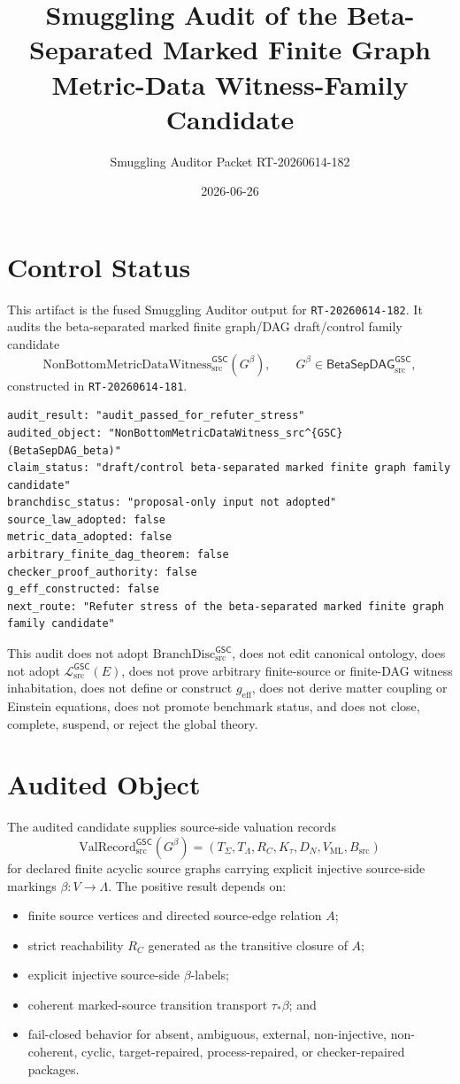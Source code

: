 \documentclass[11pt]{article}
\title{Smuggling Audit of the Beta-Separated Marked Finite Graph Metric-Data Witness-Family Candidate}
\author{Smuggling Auditor Packet RT-20260614-182}
\date{2026-06-26}
\newcommand{\Witness}{\mathrm{NonBottomMetricDataWitness}_{\mathrm{src}}^{\mathsf{GSC}}}
\newcommand{\MetricData}{\mathcal{L}_{\mathrm{src}}^{\mathsf{GSC}}}
\newcommand{\ValRecord}{\mathrm{ValRecord}_{\mathrm{src}}^{\mathsf{GSC}}}
\newcommand{\geff}{g_{\mathrm{eff}}}
\newcommand{\BranchDisc}{\mathrm{BranchDisc}_{\mathrm{src}}^{\mathsf{GSC}}}
\newcommand{\BetaGraph}{\mathsf{BetaSepDAG}_{\mathrm{src}}^{\mathsf{GSC}}}
\begin{document}
\maketitle

\section{Control Status}

This artifact is the fused Smuggling Auditor output for
\texttt{RT-20260614-182}. It audits the beta-separated marked finite graph/DAG
draft/control family candidate
\[
  \Witness(G^\beta),\qquad G^\beta\in \BetaGraph,
\]
constructed in \texttt{RT-20260614-181}.

\begin{verbatim}
audit_result: "audit_passed_for_refuter_stress"
audited_object: "NonBottomMetricDataWitness_src^{GSC}(BetaSepDAG_beta)"
claim_status: "draft/control beta-separated marked finite graph family candidate"
branchdisc_status: "proposal-only input not adopted"
source_law_adopted: false
metric_data_adopted: false
arbitrary_finite_dag_theorem: false
checker_proof_authority: false
g_eff_constructed: false
next_route: "Refuter stress of the beta-separated marked finite graph family candidate"
\end{verbatim}

This audit does not adopt \(\BranchDisc\), does not edit canonical ontology,
does not adopt \(\MetricData(E)\), does not prove arbitrary finite-source or
finite-DAG witness inhabitation, does not define or construct \(\geff\), does
not derive matter coupling or Einstein equations, does not promote benchmark
status, and does not close, complete, suspend, or reject the global theory.

\section{Audited Object}

The audited candidate supplies source-side valuation records
\[
  \ValRecord(G^\beta)=
  (T_{\Sigma},T_{\Lambda},R_C,K_{\tau},D_N,V_{\mathrm{ML}},B_{\mathrm{src}})
\]
for declared finite acyclic source graphs carrying explicit injective
source-side markings \(\beta:V\to\Lambda\). The positive result depends on:
\begin{itemize}[leftmargin=*]
  \item finite source vertices and directed source-edge relation \(A\);
  \item strict reachability \(R_C\) generated as the transitive closure of \(A\);
  \item explicit injective source-side \(\beta\)-labels;
  \item coherent marked-source transition transport \(\tau_\ast\beta\); and
  \item fail-closed behavior for absent, ambiguous, external, non-injective,
  non-coherent, cyclic, target-repaired, process-repaired, or checker-repaired
  packages.
\end{itemize}
\end{document}
